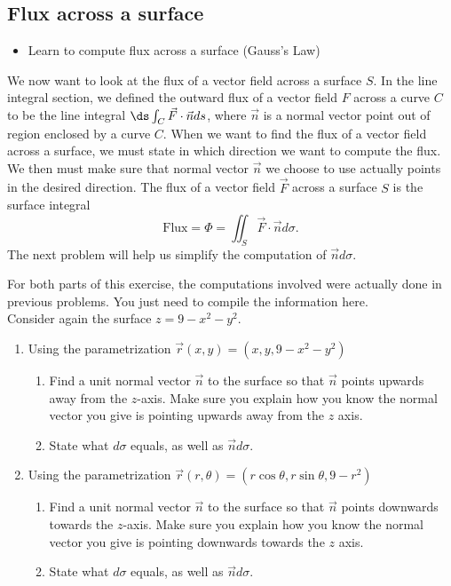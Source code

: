 
\subsection{Flux across a surface}
\begin{itemize}
\item Learn to compute flux across a surface (Gauss's Law)
\end{itemize}


We now want to look at the flux of a vector field across a surface $S$.  In the line integral section, we defined the outward flux of a vector field $F$ across a curve $C$ to be the line integral $\ds \int_C \vec F\cdot \vec n ds$, where $\vec n$ is a normal vector point out of region enclosed by a curve $C$. When we want to find the flux of a vector field across a surface, we must state in which direction we want to compute the flux. We then must make sure that normal vector $\vec n$ we choose to use actually points in the desired direction. The flux of a vector field $\vec F$ across a surface $S$ is the surface integral
$$\text{Flux}=\Phi 
= \iint_S \vec F\cdot \vec n d\sigma 
.$$
The next problem will help us simplify the computation of $\vec nd\sigma$.

\begin{problem}
For both parts of this exercise, the computations involved were actually done in previous problems. You just need to compile the information here.\\

Consider again the surface $z=9-x^2-y^2$. 
\begin{enumerate}
	\item Using the parametrization $\vec r(x,y) =(x,y,9-x^2-y^2)$
	\begin{enumerate}
		\item Find a unit normal vector $\vec n$ to the surface so that $\vec n$ points upwards away from the $z$-axis. Make sure you explain how you know the normal vector you give is pointing upwards away from the $z$ axis.
		\item State what $d\sigma$ equals, as well as $\vec n d\sigma$.
	\end{enumerate}
	\item Using the parametrization $\vec r(r,\theta) =(r\cos \theta,r\sin\theta ,9-r^2)$
	\begin{enumerate}
		\item Find a unit normal vector $\vec n$ to the surface so that $\vec n$ points downwards towards the $z$-axis. Make sure you explain how you know the normal vector you give is pointing downwards towards the $z$ axis.
		\item State what $d\sigma$ equals, as well as $\vec n d\sigma$.
	\end{enumerate}

\end{enumerate}

\end{problem}


